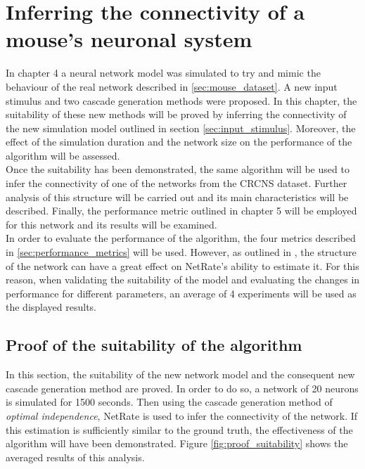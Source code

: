 
\chapter{Inferring the connectivity of a mouse's neuronal system}

In chapter 4 a neural network model was simulated to try and mimic the behaviour of the real network described in \ref{sec:mouse_dataset}. A new input stimulus and two cascade generation methods were proposed. In this chapter, the suitability of these new methods will be proved by inferring the connectivity of the new simulation model outlined in section \ref{sec:input_stimulus}. Moreover, the effect of the simulation duration and the network size on the performance of the algorithm will be assessed.\\

Once the suitability has been demonstrated, the same algorithm will be used to infer the connectivity of one of the networks from the CRCNS dataset. Further analysis of this structure will be carried out and its main characteristics will be described. Finally, the performance metric outlined in chapter 5 will be employed for this network and its results will be examined.\\

In order to evaluate the performance of the algorithm, the four metrics described in \ref{sec:performance_metrics} will be used. However, as outlined in \cite{pranav_report}, the structure of the network can have a great effect on NetRate's ability to estimate it. For this reason, when validating the suitability of the model and evaluating the changes in performance for different parameters, an average of 4 experiments will be used as the displayed results.

\section{Proof of the suitability of the algorithm}\label{sec:proof_suitability}

In this section, the suitability of the new network model and the consequent new cascade generation method are proved. In order to do so, a network of 20 neurons is simulated for 1500 seconds. Then using the cascade generation method of \textit{optimal independence}, NetRate is used to infer the connectivity of the network. If this estimation is sufficiently similar to the ground truth, the effectiveness of the algorithm will have been demonstrated. Figure \ref{fig:proof_suitability} shows the averaged results of this analysis.\\

